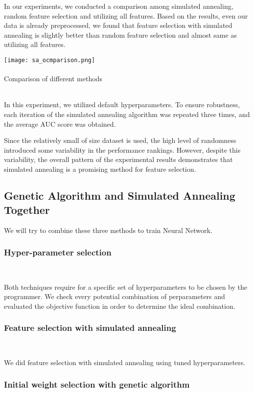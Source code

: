 \documentclass[conference]{IEEEtran}
\begin{document}
In our experiments, we conducted a comparison among  simulated annealing, random feature selection and utilizing all features. Based on the results, even our data is already preprocessed, we found that feature selection with simulated annealing is slightly better than random feature selection and almost same as utilizing all features.

\begin{center}
\texttt{[image: sa\_ocmparison.png]}\\ \ \\ 
\footnotesize{Comparison of different methods}
\end{center}\\ 


In this experiment, we utilized default hyperparameters. To ensure robustness, each iteration of the simulated annealing algorithm was repeated three times, and the average AUC score was obtained.

Since the relatively small of size dataset is used, the high level of randomness introduced some variability in the performance rankings.  However, despite this variability, the overall pattern of the experimental results demonstrates that simulated annealing is a promising method for feature selection.

\subsection{Genetic Algorithm and Simulated Annealing Together}
We will try to combine these three methods to train Neural Network.
\subsubsection{Hyper-parameter selection}
\ 

Both techniques require for a specific set of hyperparameters to be chosen by the programmer. We check every potential combination of perparameters and evaluated the objective function in order to determine the ideal combination.

\subsubsection{Feature selection with simulated annealing}
\

We did feature selection with simulated annealing using tuned hyperparameters.
\subsubsection{Initial weight selection with genetic algorithm}
\
\end{document}
